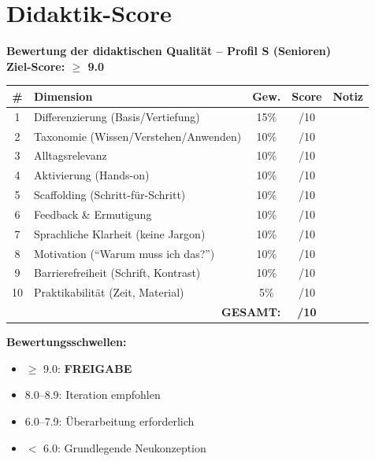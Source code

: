\documentclass[11pt,a4paper]{article}
\begin{document}
\newpage
\section{Didaktik-Score}

\begin{scorebox}
\textbf{Bewertung der didaktischen Qualität -- Profil S (Senioren)}\\
\textbf{Ziel-Score: $\geq$ 9.0}

\vspace{1em}
\begin{tabular}{|c|l|c|c|p{4cm}|}
\hline
\textbf{\#} & \textbf{Dimension} & \textbf{Gew.} & \textbf{Score} & \textbf{Notiz} \\
\hline
1 & Differenzierung (Basis/Vertiefung) & 15\% & /10 & \\
\hline
2 & Taxonomie (Wissen/Verstehen/Anwenden) & 10\% & /10 & \\
\hline
3 & Alltagsrelevanz & 10\% & /10 & \\
\hline
4 & Aktivierung (Hands-on) & 10\% & /10 & \\
\hline
5 & Scaffolding (Schritt-für-Schritt) & 10\% & /10 & \\
\hline
6 & Feedback \& Ermutigung & 10\% & /10 & \\
\hline
7 & Sprachliche Klarheit (keine Jargon) & 10\% & /10 & \\
\hline
8 & Motivation (``Warum muss ich das?'') & 10\% & /10 & \\
\hline
9 & Barrierefreiheit (Schrift, Kontrast) & 10\% & /10 & \\
\hline
10 & Praktikabilität (Zeit, Material) & 5\% & /10 & \\
\hline
\multicolumn{3}{|r|}{\textbf{GESAMT:}} & \textbf{/10} & \\
\hline
\end{tabular}

\vspace{1em}
\textbf{Bewertungsschwellen:}
\begin{itemize}
    \item[$\Box$] \textcolor{successgreen}{$\geq$ 9.0: \textbf{FREIGABE}}
    \item[$\Box$] \textcolor{warningorange}{8.0--8.9: Iteration empfohlen}
    \item[$\Box$] 6.0--7.9: Überarbeitung erforderlich
    \item[$\Box$] $<$ 6.0: Grundlegende Neukonzeption
\end{itemize}
\end{scorebox}
\end{document}
